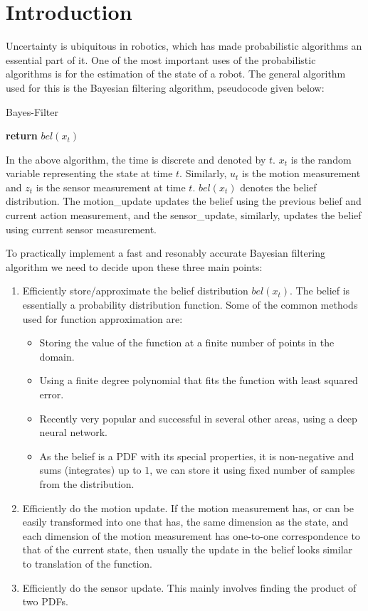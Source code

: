 \section{Introduction}
Uncertainty is ubiquitous in robotics, which has made probabilistic algorithms an essential part of it. One of the most important uses of the probabilistic algorithms is for the estimation of the state of a robot. The general algorithm used for this is the Bayesian filtering algorithm, pseudocode given below:

\begin{algorithm}
\caption{Bayes-Filter}\label{bayes_algo}
\begin{algorithmic}[1]
\State \textbf{return} $bel(x_t)$ 
\end{algorithmic}
\end{algorithm}

In the above algorithm, the time is discrete and denoted by $t$. $x_t$ is the random variable representing the state at time $t$. Similarly, $u_t$ is the motion measurement and $z_t$ is the sensor measurement at time $t$. $bel(x_t)$ denotes the belief distribution. The motion\_update updates the belief using the previous belief and current action measurement, and the sensor\_update, similarly, updates the belief using current sensor measurement.

To practically implement a fast and resonably accurate Bayesian filtering algorithm we need to decide upon these three main points:
\begin{enumerate}
\item Efficiently store/approximate the belief distribution $bel(x_t)$. The belief is essentially a probability distribution function. Some of the common methods used for function approximation are:
\begin{itemize}
	\item Storing the value of the function at a finite number of points in the domain.
	\item Using a finite degree polynomial that fits the function with least squared error.
	\item Recently very popular and successful in several other areas, using a deep neural network.
	\item As the belief is a PDF with its special properties, it is non-negative and sums (integrates) up to $1$, we can store it using fixed number of samples from the distribution.
\end{itemize}
\item Efficiently do the motion update. If the motion measurement has, or can be easily transformed into one that has, the same dimension as the state, and each dimension of the motion measurement has one-to-one correspondence to that of the current state, then usually the update in the belief looks similar to translation of the function.
\item Efficiently do the sensor update. This mainly involves finding the product of two PDFs.
\end{enumerate}


